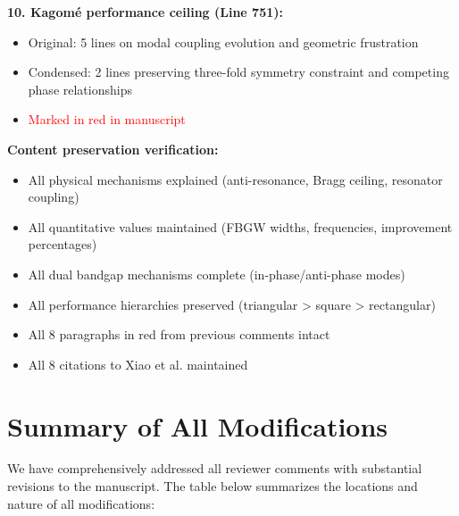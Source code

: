 \documentclass[11pt,a4paper]{article}
\newenvironment{changesbox}{%
    \par\medskip\noindent{\color{changescolor}\rule{\linewidth}{2pt}}\par
    \noindent{\color{changescolor}\bfseries Manuscript Changes}\par\smallskip
}{%
    \par\noindent{\color{changescolor}\rule{\linewidth}{0.5pt}}\medskip
}
\begin{document}
\begin{changesbox}
\textbf{10. Kagom\'{e} performance ceiling (Line 751):}
\begin{itemize}
    \item Original: 5 lines on modal coupling evolution and geometric frustration
    \item Condensed: 2 lines preserving three-fold symmetry constraint and competing phase relationships
    \item \textcolor{red}{Marked in red in manuscript}
\end{itemize}

\textbf{Content preservation verification:}
\begin{itemize}
    \item \checkmark All physical mechanisms explained (anti-resonance, Bragg ceiling, resonator coupling)
    \item \checkmark All quantitative values maintained (FBGW widths, frequencies, improvement percentages)
    \item \checkmark All dual bandgap mechanisms complete (in-phase/anti-phase modes)
    \item \checkmark All performance hierarchies preserved (triangular > square > rectangular)
    \item \checkmark All 8 paragraphs in red from previous comments intact
    \item \checkmark All 8 citations to Xiao et al. maintained
\end{itemize}
\end{changesbox}

\newpage

\section*{Summary of All Modifications}

We have comprehensively addressed all reviewer comments with substantial revisions to the manuscript. The table below summarizes the locations and nature of all modifications:
\end{document}
